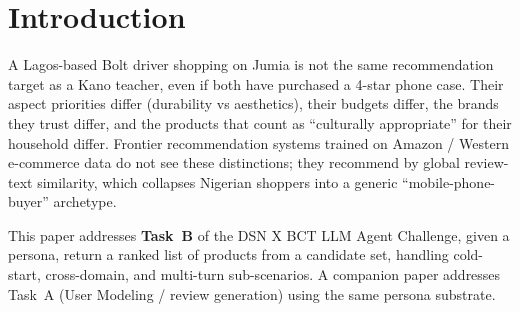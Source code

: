 \documentclass[sigconf,nonacm,balance]{acmart}
\begin{document}
\section{Introduction}

A Lagos-based Bolt driver shopping on Jumia is not the same recommendation
target as a Kano teacher, even if both have purchased a 4-star phone case.
Their aspect priorities differ (durability vs aesthetics), their budgets
differ, the brands they trust differ, and the products that count as
``culturally appropriate'' for their household differ. Frontier
recommendation systems trained on Amazon / Western e-commerce data do
not see these distinctions; they recommend by global review-text
similarity, which collapses Nigerian shoppers into a generic
``mobile-phone-buyer'' archetype.

This paper addresses \textbf{Task~B} of the DSN X BCT LLM Agent Challenge, given a persona, return a ranked list of products from
a candidate set, handling cold-start, cross-domain, and multi-turn
sub-scenarios. A companion paper addresses Task~A (User Modeling /
review generation) using the same persona substrate.
\end{document}
